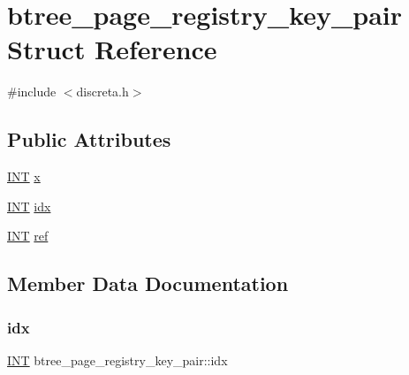 \hypertarget{structbtree__page__registry__key__pair}{}\section{btree\+\_\+page\+\_\+registry\+\_\+key\+\_\+pair Struct Reference}
\label{structbtree__page__registry__key__pair}


{\ttfamily \#include $<$discreta.\+h$>$}

\subsection*{Public Attributes}
\begin{DoxyCompactItemize}
\item 
\mbox{\hyperlink{galois_8h_a09fddde158a3a20bd2dcadb609de11dc}{I\+NT}} \mbox{\hyperlink{structbtree__page__registry__key__pair_aacfd18886d4f7f327fdc5f197cb48ca4}{x}}
\item 
\mbox{\hyperlink{galois_8h_a09fddde158a3a20bd2dcadb609de11dc}{I\+NT}} \mbox{\hyperlink{structbtree__page__registry__key__pair_a8f5d4e5d5f2d160c99ce65c7e518c3d2}{idx}}
\item 
\mbox{\hyperlink{galois_8h_a09fddde158a3a20bd2dcadb609de11dc}{I\+NT}} \mbox{\hyperlink{structbtree__page__registry__key__pair_a07856bad1d0602acb465adb627c42eca}{ref}}
\end{DoxyCompactItemize}


\subsection{Member Data Documentation}
\mbox{\label{structbtree__page__registry__key__pair_a8f5d4e5d5f2d160c99ce65c7e518c3d2}} 
\subsubsection{\texorpdfstring{idx}{idx}}
{\footnotesize\ttfamily \mbox{\hyperlink{galois_8h_a09fddde158a3a20bd2dcadb609de11dc}{I\+NT}} btree\+\_\+page\+\_\+registry\+\_\+key\+\_\+pair\+::idx}

\mbox{\label{structbtree__page__registry__key__pair_a07856bad1d0602acb465adb627c42eca}} 
